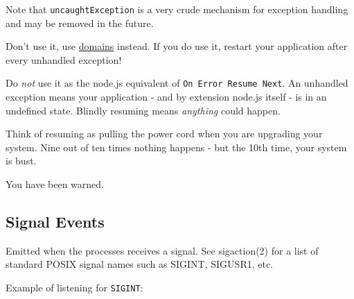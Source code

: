 \begin{Shaded}
\begin{Highlighting}[]
\NormalTok{(}\NormalTok{, } 
  \NormalTok{(} 
\NormalTok{\});}

 \NormalTok{() \{}
  \NormalTok{(}\NormalTok{);}
\NormalTok{\}, }\NormalTok{);}

\NormalTok{(}\NormalTok{);}
\end{Highlighting}
\end{Shaded}

Note that \texttt{uncaughtException} is a very crude mechanism for
exception handling and may be removed in the future.

Don't use it, use \href{domain.html}{domains} instead. If you do use it,
restart your application after every unhandled exception!

Do \emph{not} use it as the node.js equivalent of
\texttt{On Error Resume Next}. An unhandled exception means your
application - and by extension node.js itself - is in an undefined
state. Blindly resuming means \emph{anything} could happen.

Think of resuming as pulling the power cord when you are upgrading your
system. Nine out of ten times nothing happens - but the 10th time, your
system is bust.

You have been warned.

\subsection{Signal Events}

Emitted when the processes receives a signal. See sigaction(2) for a
list of standard POSIX signal names such as SIGINT, SIGUSR1, etc.

Example of listening for \texttt{SIGINT}:

\begin{Shaded}
\begin{Highlighting}[]
\NormalTok{();}

\NormalTok{(}\NormalTok{, } \NormalTok{() \{}
  \NormalTok{(}\NormalTok{);}
\NormalTok{\});}
\end{Highlighting}
\end{Shaded}

